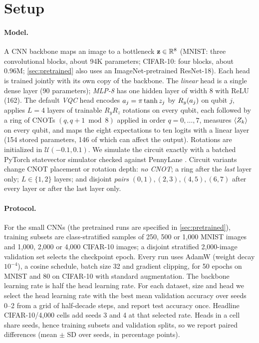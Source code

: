 \section{Setup}
\label{sec:setup}

\paragraph{Model.}
A CNN backbone maps an image to a bottleneck $\mathbf{z}\in\mathbb{R}^8$ (MNIST: three convolutional
blocks, about 94K parameters; CIFAR-10: four blocks, about 0.96M; \cref{sec:pretrained}
also uses an ImageNet-pretrained ResNet-18). Each head is trained
jointly with its own copy of the backbone. The \emph{linear} head is a single dense layer
(90 parameters); \emph{MLP-8} has one hidden layer of width 8 with ReLU (162). The default
\emph{VQC} head encodes $a_{j}=\pi\tanh z_j$ by $R_y(a_{j})$ on qubit $j$, applies $L=4$
layers of trainable $R_y R_z$ rotations on every qubit, each followed by a ring of CNOTs
$(q,q{+}1 \bmod 8)$ applied in order $q=0,\dots,7$, measures $\langle Z_{k}\rangle$ on every qubit, and
maps the eight expectations to ten logits with a linear layer (154 stored parameters, 146
of which can affect the output). Rotations are initialized in $\mathcal{U}(-0.1,0.1)$. We
simulate the circuit exactly with a batched PyTorch statevector simulator checked against
PennyLane \citep{bergholm2018}. Circuit variants change CNOT placement or rotation
depth: \emph{no CNOT}; a ring after the \emph{last} layer only; $L\in\{1,2\}$
layers; and disjoint \emph{pairs} $(0,1),(2,3),(4,5),(6,7)$ after every layer or after the
last layer only.

\paragraph{Protocol.}
For the small CNNs (the pretrained runs are specified in \cref{sec:pretrained}), training subsets are class-stratified samples of 250, 500 or 1,000 MNIST images and 1,000,
2,000 or 4,000 CIFAR-10 images; a disjoint stratified 2,000-image validation set selects
the checkpoint epoch. Every run uses AdamW (weight decay $10^{-4}$), a cosine schedule,
batch size 32 and gradient clipping, for 50 epochs on MNIST and 80 on CIFAR-10 with
standard augmentation. The backbone learning rate is half the head learning rate. For each
dataset, size and head we select the head learning rate with the best mean validation
accuracy over seeds 0--2 from a grid of half-decade steps, and report test accuracy once.
Headline CIFAR-10/4,000 cells add seeds 3 and 4 at that selected rate. Heads in a cell share
seeds, hence training subsets and validation splits, so we report paired differences
(mean $\pm$ SD over seeds, in percentage points).

